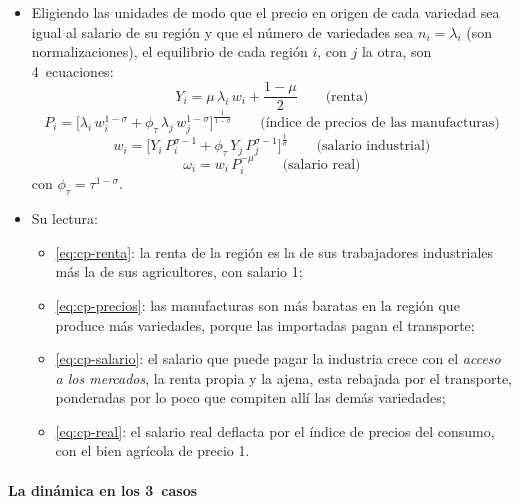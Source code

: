 \documentclass[11pt]{article}
\begin{document}
\begin{itemize}
\item Eligiendo las unidades de modo que el precio en origen de cada variedad sea igual al salario de su región y que el número de variedades sea $n_i=\lambda_i$ (son normalizaciones), el equilibrio de cada región $i$, con $j$ la otra, son 4~ecuaciones\nocite{FujitaKrugmanVenables1999Spatial}:
  \begin{equation}\label{eq:cp-renta}
  Y_i=\mu\,\lambda_i\,w_i+\frac{1-\mu}{2}\qquad\text{(renta)}
  \end{equation}
  \begin{equation}\label{eq:cp-precios}
  P_i=\Big[\lambda_i\,w_i^{1-\sigma}+\phi_\tau\,\lambda_j\,w_j^{1-\sigma}\Big]^{\frac{1}{1-\sigma}}\qquad\text{(índice de precios de las manufacturas)}
  \end{equation}
  \begin{equation}\label{eq:cp-salario}
  w_i=\Big[Y_i\,P_i^{\sigma-1}+\phi_\tau\,Y_j\,P_j^{\sigma-1}\Big]^{\frac{1}{\sigma}}\qquad\text{(salario industrial)}
  \end{equation}
  \begin{equation}\label{eq:cp-real}
  \omega_i=w_i\,P_i^{-\mu}\qquad\text{(salario real)}
  \end{equation}
  con $\phi_\tau=\tau^{1-\sigma}$.
\item Su lectura:
  \begin{itemize}
  \item \eqref{eq:cp-renta}: la renta de la región es la de sus trabajadores industriales más la de sus agricultores, con salario 1;
  \item \eqref{eq:cp-precios}: las manufacturas son más baratas en la región que produce más variedades, porque las importadas pagan el transporte;
  \item \eqref{eq:cp-salario}: el salario que puede pagar la industria crece con el \emph{acceso a los mercados}, la renta propia y la ajena, esta rebajada por el transporte, ponderadas por lo poco que compiten allí las demás variedades;
  \item \eqref{eq:cp-real}: el salario real deflacta por el índice de precios del consumo, con el bien agrícola de precio 1.
  \end{itemize}
\end{itemize}

\paragraph{La dinámica en los 3~casos}
\end{document}
